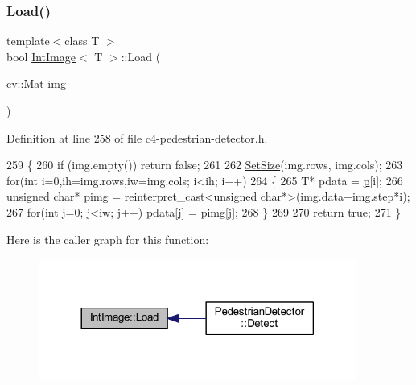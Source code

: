 \subsubsection{\texorpdfstring{Load()}{Load()}}
{\footnotesize\ttfamily template$<$class T $>$ \\
bool \mbox{\hyperlink{class_int_image}{Int\+Image}}$<$ T $>$\+::Load (\begin{DoxyParamCaption}\item[{cv\+::\+Mat}]{img }\end{DoxyParamCaption})}



Definition at line 258 of file c4-\/pedestrian-\/detector.\+h.


\begin{DoxyCode}
259 \{
260     \textcolor{keywordflow}{if} (img.empty()) \textcolor{keywordflow}{return} \textcolor{keyword}{false};
261 
262     \mbox{\hyperlink{class_int_image_a89eb8fac3fde8d3ce392e5f28c14f8b0}{SetSize}}(img.rows, img.cols);
263     \textcolor{keywordflow}{for}(\textcolor{keywordtype}{int} i=0,ih=img.rows,iw=img.cols; i<ih; i++)
264     \{
265         T* pdata = \mbox{\hyperlink{class_array2d_c_a727eae5d663d463635cc150e6f771f0d}{p}}[i];
266         \textcolor{keywordtype}{unsigned} \textcolor{keywordtype}{char}* pimg = \textcolor{keyword}{reinterpret\_cast<}\textcolor{keywordtype}{unsigned} \textcolor{keywordtype}{char}*\textcolor{keyword}{>}(img.data+img.step*i);
267         \textcolor{keywordflow}{for}(\textcolor{keywordtype}{int} j=0; j<iw; j++) pdata[j] = pimg[j];
268     \}
269 
270     \textcolor{keywordflow}{return} \textcolor{keyword}{true};
271 \}
\end{DoxyCode}
Here is the caller graph for this function\+:\nopagebreak
\begin{figure}[H]
\begin{center}
\leavevmode
\includegraphics[width=296pt]{class_int_image_a9e74890b8f45d03e0c4aa335a96849d1_icgraph}
\end{center}
\end{figure}
\mbox{\label{class_int_image_a03a3f6df469a4c8569612cd0df0ff345}} 
